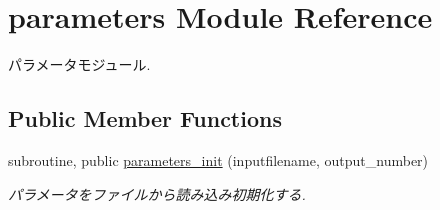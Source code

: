 \hypertarget{classparameters}{\section{parameters Module Reference}
\label{classparameters}
}


パラメータモジュール.  


\subsection*{Public Member Functions}
\begin{DoxyCompactItemize}
\item 
subroutine, public \hyperlink{classparameters_a64188ca7020e09324152ec2a91a5000e}{parameters\-\_\-init} (inputfilename, output\-\_\-number)
\begin{DoxyCompactList}\small\item\em パラメータをファイルから読み込み初期化する. \end{DoxyCompactList}\end{DoxyCompactItemize}
